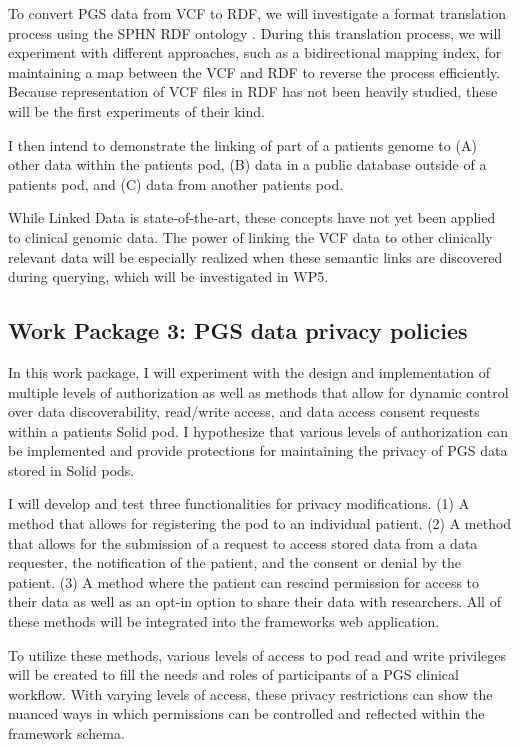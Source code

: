 \documentclass[runningheads]{llncs}
\begin{document}
To convert PGS data from VCF to RDF, we will investigate a format translation process using the SPHN RDF ontology \cite{van_der_horst_bridging_2023}. 
During this translation process, we will experiment with different approaches, such as a bidirectional mapping index, for maintaining a map between the VCF and RDF to reverse the process efficiently.
Because representation of VCF files in RDF has not been heavily studied, these will be the first experiments of their kind.

I then intend to demonstrate the linking of part of a patient\textquotesingle s genome to
(A) other data within the patient\textquotesingle s pod, 
(B) data in a public database outside of a patient\textquotesingle s pod, and
(C) data from another patient\textquotesingle s pod.

While Linked Data is state-of-the-art, these concepts have not yet been applied to clinical genomic data.
The power of linking the VCF data to other clinically relevant data will be especially realized when these semantic links are discovered during querying, which will be investigated in WP5. 


\subsection{Work Package 3: PGS data privacy policies}

In this work package, I will experiment with the design and implementation of multiple levels of authorization as well as methods that allow for dynamic control over data discoverability, read/write access, and data access consent requests within a patient\textquotesingle s Solid pod. 
I hypothesize that various levels of authorization can be implemented and provide protections for maintaining the privacy of PGS data stored in Solid pods.

I will develop and test three functionalities for privacy modifications.
(1) A method that allows for registering the pod to an individual patient.
(2) A method that allows for the submission of a request to access stored data from a data requester, the notification of the patient, and the consent or denial by the patient.
(3) A method where the patient can rescind permission for access to their data as well as an opt-in option to share their data with researchers. 
All of these methods will be integrated into the framework\textquotesingle s web application.

To utilize these methods, various levels of access to pod read and write privileges will be created to fill the needs and roles of participants of a PGS clinical workflow. 
With varying levels of access, these privacy restrictions can show the nuanced ways in which permissions can be controlled and reflected within the framework schema.
\end{document}
